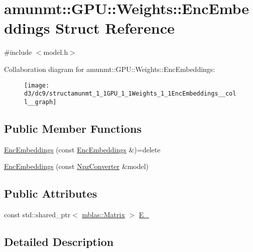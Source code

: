 \hypertarget{structamunmt_1_1GPU_1_1Weights_1_1EncEmbeddings}{}\section{amunmt\+:\+:G\+PU\+:\+:Weights\+:\+:Enc\+Embeddings Struct Reference}
\label{structamunmt_1_1GPU_1_1Weights_1_1EncEmbeddings}


{\ttfamily \#include $<$model.\+h$>$}



Collaboration diagram for amunmt\+:\+:G\+PU\+:\+:Weights\+:\+:Enc\+Embeddings\+:
\nopagebreak
\begin{figure}[H]
\begin{center}
\leavevmode
\texttt{[image: d3/dc9/structamunmt\_1\_1GPU\_1\_1Weights\_1\_1EncEmbeddings\_\_coll\_\_graph]}
\end{center}
\end{figure}
\subsection*{Public Member Functions}
\begin{DoxyCompactItemize}
\item 
\hyperlink{structamunmt_1_1GPU_1_1Weights_1_1EncEmbeddings_a4c7b419f048b610a54c15e9bc23db642}{Enc\+Embeddings} (const \hyperlink{structamunmt_1_1GPU_1_1Weights_1_1EncEmbeddings}{Enc\+Embeddings} \&)=delete
\item 
\hyperlink{structamunmt_1_1GPU_1_1Weights_1_1EncEmbeddings_aef304cdbdc05a88e6108239e5c4ebba7}{Enc\+Embeddings} (const \hyperlink{classamunmt_1_1GPU_1_1NpzConverter}{Npz\+Converter} \&model)
\end{DoxyCompactItemize}
\subsection*{Public Attributes}
\begin{DoxyCompactItemize}
\item 
const std\+::shared\+\_\+ptr$<$ \hyperlink{namespaceamunmt_1_1GPU_1_1mblas_ab67821a8254de53e45a623cf73c0aef6}{mblas\+::\+Matrix} $>$ \hyperlink{structamunmt_1_1GPU_1_1Weights_1_1EncEmbeddings_a539a4f5c1750e223a03e38a2e6e5e62c}{E\+\_\+}
\end{DoxyCompactItemize}


\subsection{Detailed Description}


